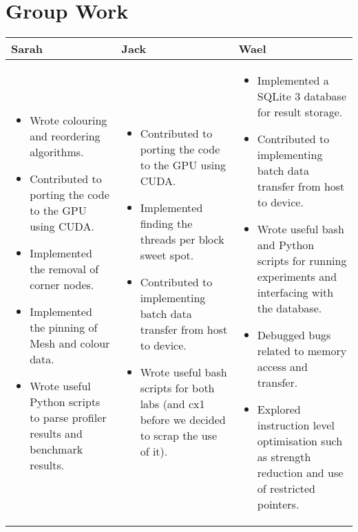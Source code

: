 \section{Group Work}
\begin{tabular}{|p{5.5cm}| p{5.5cm} | p{5.5cm} |}
  \hline
  Sarah & Jack & Wael\\
  \hline
  \hline
  \begin{itemize}[leftmargin=0.3cm]
    \item Wrote colouring and reordering algorithms.
    \item Contributed to porting the code to the GPU using CUDA.
    \item Implemented the removal of corner nodes.
    \item Implemented the pinning of Mesh and colour data.
    \item Wrote useful Python scripts to parse profiler results and benchmark results.
  \end{itemize} &

  \begin{itemize}[leftmargin=0.3cm]
    \item Contributed to porting the code to the GPU using CUDA.
    \item Implemented finding the threads per block sweet spot.
    \item Contributed to implementing batch data transfer from host to device.
    \item Wrote useful bash scripts for both labs (and cx1 before we decided to scrap the use of it).
  \end{itemize} &

  \begin{itemize}[leftmargin=0.3cm]
    \item Implemented a SQLite 3 database for result storage.
    \item Contributed to implementing batch data transfer from host to device.
    \item Wrote useful bash and Python scripts for running experiments and interfacing with the database.
    \item Debugged bugs related to memory access and transfer.
    \item Explored instruction level optimisation such as strength reduction and use of restricted pointers.
  \end{itemize} \\
  \hline
\end{tabular}
